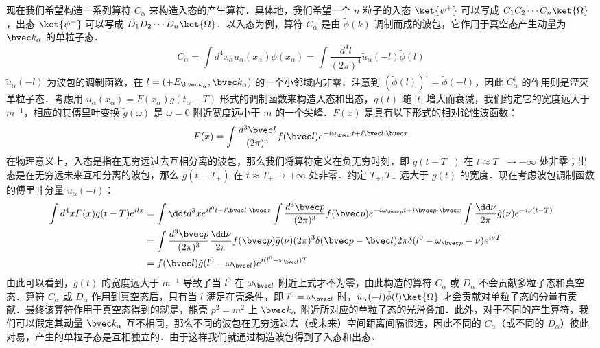 现在我们希望构造一系列算符 $C_\alpha$ 来构造入态的产生算符．具体地，我们希望一个 $n$ 粒子的入态 $\ket{\psi^+}$ 可以写成 $C_1C_2\cdots C_n \ket{\Omega}$，出态 $\ket{\psi^-}$ 可以写成 $D_1D_2\cdots D_n \ket{\Omega}$．以入态为例，算符 $C_\alpha$ 是由 $\tilde \phi(k)$ 调制而成的波包，它作用于真空态产生动量为 $\bvec k_\alpha$ 的单粒子态．
\[
C_\alpha=\int d^4 {x_\alpha} u_\alpha(x_\alpha)\phi(x_\alpha) = \int \frac{d^4  l}{(2\pi)^4} \tilde{u}_\alpha(-l)\tilde\phi(l)
\]
$\tilde{u}_\alpha(-l)$ 为波包的调制函数，在 $l=(+E_{\bvec k_\alpha},\bvec k_\alpha)$ 的一个小邻域内非零．注意到 $(\tilde{\phi}(l))^\dagger=\tilde{\phi}(-l)$，因此 $C_\alpha^\dagger$ 的作用则是湮灭单粒子态．考虑用 $u_\alpha(x_\alpha)=F(x_\alpha)g(t_\alpha-T)$ 形式的调制函数来构造入态和出态，$g(t)$ 随 $|t|$ 增大而衰减，我们约定它的宽度远大于 $m^{-1}$，相应的其傅里叶变换 $\tilde g(\omega)$ 是 $\omega=0$ 附近宽度远小于 $m$ 的一个尖峰．$F(x)$ 是具有以下形式的相对论性波函数：
\[
F(x)=\int \frac{d^3 {\bvec l}}{(2\pi)^3} f(\bvec l) e^{-i\omega_{\bvec l}t+i\bvec l\cdot \bvec x}
\]
在物理意义上，入态是指在无穷远过去互相分离的波包，那么我们将算符定义在负无穷时刻，即 $g(t-T_-)$ 在 $t\approx T_-\rightarrow -\infty$ 处非零；出态是在无穷远未来互相分离的波包，那么 $g(t-T_+)$ 在 $t\approx T_+\rightarrow +\infty$ 处非零．约定 $T_+,T_-$ 远大于 $g(t)$ 的宽度．现在考虑波包调制函数的傅里叶分量 $\tilde{u}_\alpha(-l)$：
\begin{equation}\label{LSZ_eq4}\begin{aligned}
\int d^4 {x}F(x)g(t-T)e^{ilx}&=\int \dd t d^3 {x} e^{il^0t - i\bvec l\cdot \bvec x}\int \frac{d^3 {\bvec p}}{(2\pi)^3}f(\bvec p)e^{-i\omega_{\bvec p}t+i\bvec p\cdot \bvec x}\int \frac{\dd \nu}{2\pi}\tilde g(\nu) e^{-i\nu(t-T)}\\
&=\int \frac{d^3 \bvec p}{(2\pi)^3}\frac{\dd \nu}{2\pi} f(\bvec p)\tilde g(\nu) (2\pi)^3 \delta(\bvec p-\bvec l) 2\pi \delta(l^0-\omega_{\bvec p}-\nu)e^{i\nu T}\\
&=f(\bvec l) \tilde g(l^0-\omega_{\bvec l})e^{i(l^0-\omega_{\bvec l})T}
\end{aligned}\end{equation}
由此可以看到，$g(t)$ 的宽度远大于 $m^{-1}$ 导致了当 $l^0$ 在 $\omega_{\bvec l}$ 附近上式才不为零，由此构造的算符 $C_\alpha$ 或 $D_\alpha$ 不会贡献多粒子态和真空态．算符 $C_\alpha$ 或 $D_\alpha$ 作用到真空态后，只有当 $l$ 满足在壳条件，即 $l^0=\omega_{\bvec l}$ 时，$\tilde{u}_\alpha(-l)\tilde \phi(l) \ket{\Omega}$ 才会贡献对单粒子态的分量有贡献．最终该算符作用于真空态得到的就是，能壳 $p^2=m^2$ 上 $\bvec k_\alpha$ 附近所对应的单粒子态的光滑叠加．此外，对于不同的产生算符，我们可以假定其动量 $\bvec k_\alpha$ 互不相同，那么不同的波包在无穷远过去（或未来）空间距离间隔很远，因此不同的 $C_\alpha$（或不同的 $D_\alpha$）彼此对易，产生的单粒子态是互相独立的．由于这样我们就通过构造波包得到了入态和出态．
